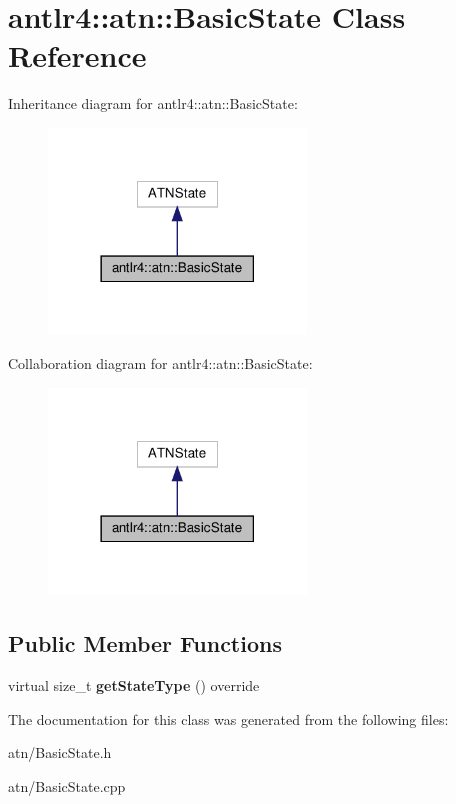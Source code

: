 \hypertarget{classantlr4_1_1atn_1_1BasicState}{}\section{antlr4\+:\+:atn\+:\+:Basic\+State Class Reference}
\label{classantlr4_1_1atn_1_1BasicState}


Inheritance diagram for antlr4\+:\+:atn\+:\+:Basic\+State\+:
\nopagebreak
\begin{figure}[H]
\begin{center}
\leavevmode
\includegraphics[width=194pt]{classantlr4_1_1atn_1_1BasicState__inherit__graph}
\end{center}
\end{figure}


Collaboration diagram for antlr4\+:\+:atn\+:\+:Basic\+State\+:
\nopagebreak
\begin{figure}[H]
\begin{center}
\leavevmode
\includegraphics[width=194pt]{classantlr4_1_1atn_1_1BasicState__coll__graph}
\end{center}
\end{figure}
\subsection*{Public Member Functions}
\begin{DoxyCompactItemize}
\item 
\mbox{\label{classantlr4_1_1atn_1_1BasicState_a56469de91f944fc01412b906b805313e}} 
virtual size\+\_\+t {\bfseries get\+State\+Type} () override
\end{DoxyCompactItemize}


The documentation for this class was generated from the following files\+:\begin{DoxyCompactItemize}
\item 
atn/Basic\+State.\+h\item 
atn/Basic\+State.\+cpp\end{DoxyCompactItemize}

